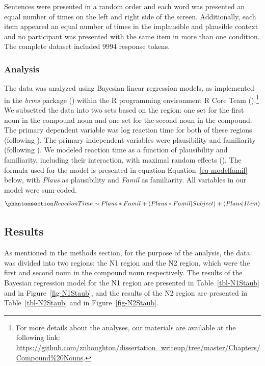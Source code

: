 \documentclass[
  12pt,
  letterpaper,
]{scrreport}
\begin{document}
Sentences were presented in a random order and each word was presented
an equal number of times on the left and right side of the screen.
Additionally, each item appeared an equal number of times in the
implausible and plausible context and no participant was presented with
the same item in more than one condition. The complete dataset included
9994 response tokens.

\subsubsection{Analysis}\label{analysis}

The data was analyzed using Bayesian linear regression models, as
implemented in the \emph{brms} package
() within
the R programming environment R Core Team
().\footnote{For more details about the
  analyses, our materials are available at the following link:
  \url{https://github.com/znhoughton/dissertation_writeup/tree/master/Chapters/Compound\%20Nouns}.}
We subsetted the data into two sets based on the region: one set for the
first noun in the compound noun and one set for the second noun in the
compound. The primary dependent variable was log reaction time for both
of these regions (following ). The primary independent variables were plausibility and
familiarity (following
). We
modeled reaction time as a function of plausibility and familiarity,
including their interaction, with maximal random effects
(). The
formula used for the model is presented in equation
Equation~\ref{eq-modelfamil} below, with \emph{Plaus} as plausibility
and \emph{Famil} as familiarity. All variables in our model were
sum-coded. \begin{equation}\phantomsection\label{eq-modelfamil}{
Reaction Time \sim Plaus*Famil+(Plaus*Famil|Subject)+(Plaus|Item)
}\end{equation}

\subsection{Results}\label{results}

As mentioned in the methods section, for the purpose of the analysis,
the data was divided into two regions: the N1 region and the N2 region,
which were the first and second noun in the compound noun respectively.
The results of the Bayesian regression model for the N1 region are
presented in Table~\ref{tbl-N1Staub} and in Figure~\ref{fig-N1Staub},
and the results of the N2 region are presented in
Table~\ref{tbl-N2Staub} and in Figure~\ref{fig-N2Staub}.
\end{document}
